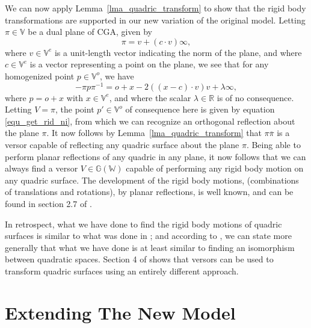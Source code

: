 \documentclass{birkjour}
\theoremstyle{definition}
\theoremstyle{remark}
\numberwithin{equation}{section}
\newcommand{\G}{\mathbb{G}}
\newcommand{\V}{\mathbb{V}}
\newcommand{\W}{\mathbb{W}}
\newcommand{\R}{\mathbb{R}}
\newcommand{\nvao}{o}
\newcommand{\nvai}{\infty}
\begin{document}
We can now apply Lemma~\ref{lma_quadric_transform} to show
that the rigid body transformations are supported in our new variation
of the original model.
Letting $\pi\in\V$ be a dual plane of CGA, given by
\begin{equation}
\pi = v+(c\cdot v)\nvai,
\end{equation}
where $v\in\V^e$ is a unit-length vector indicating the norm of the plane,
and where $c\in\V^e$ is a vector representing a point on the plane,
we see that for any homogenized point $p\in\V^o$, we have
\begin{equation}
-\pi p\pi^{-1} = \nvao+x-2((x-c)\cdot v)v + \lambda\nvai,
\end{equation}
where $p=\nvao+x$ with $x\in\V^e$, and
where the scalar $\lambda\in\R$ is of no consequence.  Letting $V=\pi$,
the point $p'\in\V^o$ of consequence here is given by equation \eqref{equ_get_rid_ni},
from which we can recognize an orthogonal reflection about the plane $\pi$.
It now follows by Lemma~\ref{lma_quadric_transform} that $\pi\overline{\pi}$ is a versor
capable of reflecting any quadric surface about the plane $\pi$.
Being able to perform planar reflections of any quadric in any plane, it
now follows that we can always find a versor $V\in\G(\W)$ capable of performing
any rigid body motion on any quadric surface.  The development
of the rigid body motions, (combinations of translations and rotations), by planar reflections,
is well known, and can be found in section 2.7 of \cite{LiRockwood}.

In retrospect, what we have done to find the rigid body motions
of quadric surfaces is similar to what was done in \cite{Langer08}; and
according to \cite{Pfister95}, we can state more generally that what we
have done is at least similar to finding an isomorphism between quadratic spaces.
Section 4 of \cite{Lasenby05} shows that versors can be used to transform quadric
surfaces using an entirely different approach.

\section{Extending The New Model}
\end{document}
